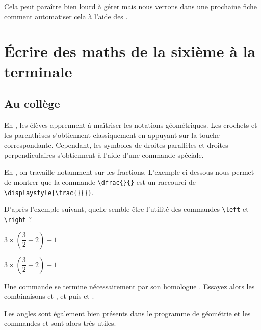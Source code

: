 \begin{info}
    Cela peut paraître bien lourd à gérer mais nous verrons dans une prochaine fiche comment automatiser cela à l'aide des .
\end{info}

\section{\'Ecrire des maths de la sixième à la terminale}

\subsection{Au collège}

En , les élèves apprennent à maîtriser les notations géométriques. Les crochets et les parenthèses s'obtiennent classiquement en appuyant sur la touche correspondante. Cependant, les symboles de droites parallèles et droites perpendiculaires s'obtiennent à l'aide d'une commande spéciale.


En , on travaille notamment sur les fractions. L'exemple ci-dessous nous permet de montrer que la commande \verb!\dfrac{}{}! est un raccourci de \verb!\displaystyle{\frac{}{}}!.


D'après l'exemple suivant, quelle semble être l'utilité des commandes \verb!\left! et \verb!\right! ? \bigskip

{\NewFont
\begin{SideBySideExample}
    $3 \times (\dfrac 3 2 + 2) - 1$ \par\medskip
    $3 \times \left(\dfrac 3 2 + 2\right) - 1$
\end{SideBySideExample}
}\bigskip

\begin{info}
    Une commande  se termine nécessairement par son homologue . Essayez alors les combinaisons  et , \NomCom{left[} et \NomCom{right]} puis  et .
\end{info}

Les angles sont également bien présents dans le programme de géométrie et les commandes  et  sont alors très utiles.

